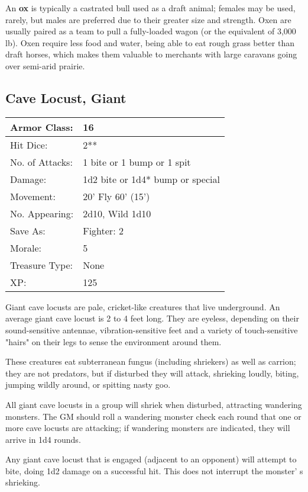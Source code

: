 \documentclass[a4paper,twoside,openany,10pt]{book}
\begin{document}
\begin{multicols}{2}
An \textbf{ox }is typically a castrated bull used as a draft animal; females may be used, rarely, but males are preferred due to their greater size and strength. Oxen are usually paired as a team to pull a fully-loaded wagon (or the equivalent of 3,000 lb). Oxen require less food and water, being able to eat rough grass better than draft horses, which makes them valuable to merchants with large caravans going over semi-arid prairie.

\subsection*{Cave Locust, Giant}\label{cave-locust-giant}

\begin{tabularx}{0.48\textwidth}{@{}lX@{}}
Armor Class: & 16 \\\hline
Hit Dice: & 2** \\\hline
No. of Attacks: & 1 bite or 1 bump or 1 spit \\\hline
Damage: & 1d2 bite or 1d4* bump or special \\\hline
Movement: & 20' Fly 60'
(15') \\\hline
No. Appearing: & 2d10, Wild 1d10 \\\hline
Save As: & Fighter: 2 \\\hline
Morale: & 5 \\\hline
Treasure Type: & None \\\hline
XP: & 125 \\\hline
\end{tabularx}\medskip

Giant cave locusts are pale, cricket-like creatures that live underground. An average giant cave locust is 2 to 4 feet long. They are eyeless, depending on their sound-sensitive antennae, vibration-sensitive feet and a variety of touch-sensitive "hairs" on their legs to sense the environment around them.

These creatures eat subterranean fungus (including shriekers) as well as carrion; they are not predators, but if disturbed they will attack, shrieking loudly, biting, jumping wildly around, or spitting nasty goo.

All giant cave locusts in a group will shriek when disturbed, attracting wandering monsters. The GM should roll a wandering monster check each round that one or more cave locusts are attacking; if wandering monsters are indicated, they will arrive in 1d4 rounds.

Any giant cave locust that is engaged (adjacent to an opponent) will attempt to bite, doing 1d2 damage on a successful hit. This does not interrupt the monster' s shrieking.


\end{multicols}
\end{document}
